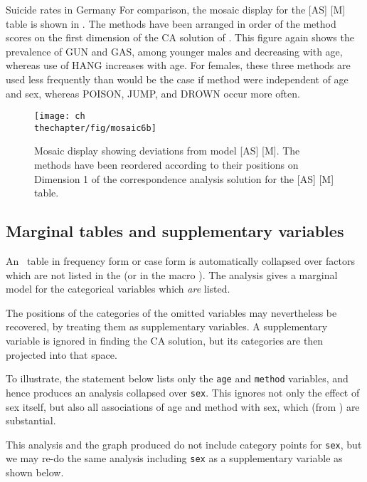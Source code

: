 \begin{Example}[suicide1]{Suicide rates in Germany}
For comparison, the mosaic display for the [AS] [M] table
is shown in .
The methods have been arranged in order
of the method scores on the first dimension of the CA solution
of .
This figure
again shows the prevalence of GUN and
GAS, among younger males and decreasing with age, whereas use of HANG
increases with age.  For females, these three methods are used less
frequently than would be the case if method were independent of age
and sex, whereas POISON, JUMP, and DROWN occur more often.

\begin{figure}[!htb]
  \centering
  \texttt{[image: ch\\thechapter/fig/mosaic6b]}
  \caption[Mosaic display showing deviations from
model AS, M]{Mosaic display showing deviations from
model [AS] [M].  The methods have been reordered according to their
positions on Dimension 1 of the correspondence analysis solution for
the [AS] [M] table.}\label{fig:mosaic6b}
\end{figure}
\end{Example}

\subsection{Marginal tables and supplementary variables}
An \nway\ table in frequency form or case form is automatically collapsed
over factors which are not listed in the
 (or in the macro ).
The analysis gives a marginal model for the categorical variables which
\emph{are} listed.  

The positions of the categories of the omitted variables
may nevertheless be recovered, by treating them as supplementary variables.
A supplementary variable is ignored in finding the CA solution,
but its categories are then projected into that space.

To illustrate, the statement below lists only the \texttt{age}
and \texttt{method} variables, and hence produces an analysis
collapsed over \texttt{sex}.
This ignores not only the effect of sex itself,
but also all associations of age and method with sex,
which (from ) are substantial.
\begin{listing}
\end{listing}

This analysis and 
the graph produced do not include category points for \texttt{sex},
but we may re-do the same analysis including \texttt{sex} as a supplementary
variable as shown below.

